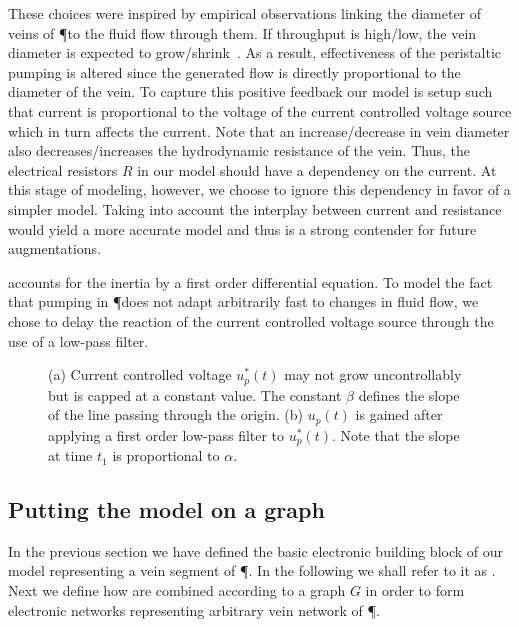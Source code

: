 These choices were inspired by empirical observations linking the diameter of veins of \P to the fluid flow through them. If throughput is high/low, the vein diameter is expected to grow/shrink~\cite{nakagaki2000intelligence}. As a result, effectiveness of the peristaltic pumping is altered since the generated flow is directly proportional to the diameter of the vein. To capture this positive feedback our model is setup such that current is proportional to the voltage of the current controlled voltage source which in turn affects the current. Note that an increase/decrease in vein diameter also decreases/increases the hydrodynamic resistance of the vein. Thus, the electrical resistors $R$ in our model should have a dependency on the current. At this stage of modeling, however, we choose to ignore this dependency in favor of a simpler model. Taking into account the interplay between current and resistance would yield a more accurate model and thus is a strong contender for future augmentations.

 accounts for the inertia by a first order differential equation. To model the fact that pumping in \P does not adapt arbitrarily fast to changes in fluid flow, we chose to delay the reaction of the current controlled voltage source through the use of a low-pass filter.
  
\begin{figure}
    \centering
        \subfloat[]{%
    \label{fig:steady}%
    }%
    \qquad
      \subfloat[]{%
    \label{fig:transient}%
    }%
      \caption[Details for current controlled voltage sources.]{(a) Current controlled voltage $u^*_p(t)$ may not grow uncontrollably but is capped at a constant value. The constant $\beta$ defines the slope of the line passing through the origin. (b) $u_p(t)$ is gained after applying a first order low-pass filter to $u^*_p(t)$. Note that the slope
      at time $t_1$ is proportional to $\alpha$.}
\end{figure}


\subsection{Putting the model on a graph}

  In the previous section we have defined the basic electronic building block of our model representing a vein segment of \P. In the following we shall refer to it as \Pe. Next we define how \Pes are combined according to a graph $G$ in order to form electronic networks representing arbitrary vein network of \P.

